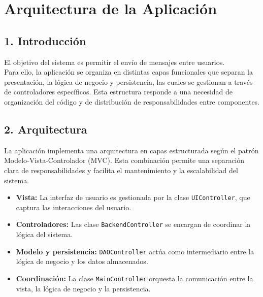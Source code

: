 \section*{Arquitectura de la Aplicación}

\subsection*{1. Introducción}

El objetivo del sistema es permitir el envío de mensajes entre usuarios.\\
Para ello, la aplicación se organiza en distintas capas funcionales que separan la presentación, la lógica de negocio y persistencia, 
las cuales se gestionan a través de controladores específicos.
Esta estructura responde a una necesidad de organización del código y de distribución de responsabilidades entre componentes.

\vspace{5ex}

\subsection*{2. Arquitectura}

La aplicación implementa una arquitectura en capas estructurada según el patrón Modelo-Vista-Controlador (MVC).
Esta combinación permite una separación clara de responsabilidades y facilita el mantenimiento y la escalabilidad del sistema.

\begin{itemize}
    \item \textbf{Vista:} La interfaz de usuario es gestionada por la clase \texttt{UIController}, que captura las interacciones del usuario.
    \item \textbf{Controladores:} Las clase \texttt{BackendController} se encargan de coordinar la lógica del sistema.
    \item \textbf{Modelo y persistencia:} \texttt{DAOController} actúa como intermediario entre la lógica de negocio y los datos almacenados.
    \item \textbf{Coordinación:} La clase \texttt{MainController} orquesta la comunicación entre la vista, la lógica de negocio y la persistencia.
\end{itemize}

